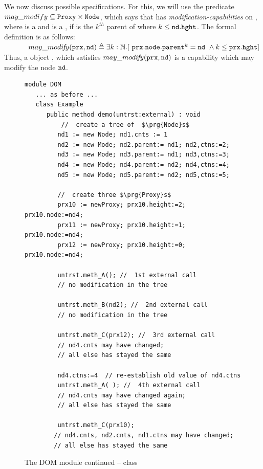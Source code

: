 We now discuss possible specifications. For this, we will use  the predicate $may\_modify \subseteq \mbox{\normalfont{\texttt{Proxy}}} \times \mbox{\normalfont{\texttt{Node}}}$, which says that 
 has \emph{modification-capabilities} on , where  is
a   and  is a , if  is the $k^{th}$  parent
of    where $k \leq \mbox{\normalfont{\texttt{nd}}}.\mbox{\normalfont{\texttt{hght}}}$.
The formal definition is as follows:
\\
$\strut \ \ \ \ \ \ \ \ \ \    may\_modi\!f\!y(\mbox{\normalfont{\texttt{prx}}}, \mbox{\normalfont{\texttt{nd}}}) \triangleq \exists k:\mathbb{N}. [ \  \mbox{\normalfont{\texttt{prx}}}.\mbox{\normalfont{\texttt{node}}}.\mbox{\normalfont{\texttt{parent}}}^k=\mbox{\normalfont{\texttt{nd}}}\ \wedge k\leq   \mbox{\normalfont{\texttt{prx}}}.\mbox{\normalfont{\texttt{hght}}}]$
\\
Thus, a  object , which satisfies $may\_modi\!f\!y(\mbox{\normalfont{\texttt{prx}}},\mbox{\normalfont{\texttt{nd}}})$ is a capability which may modify the node $\mbox{\normalfont{\texttt{nd}}}$. 


\begin{figure}[tbh]
\begin{lstlisting}[language = Chainmail, mathescape=true, frame=lines]
module DOM 
   ... as before ...
   class Example
      public method demo(untrst:external) : void 
          //  create a tree of  $\prg{Node}s$
         nd1 := new Node; nd1.cnts := 1
         nd2 := new Mode; nd2.parent:= nd1; nd2,ctns:=2;
         nd3 := new Mode; nd3.parent:= nd1; nd3,ctns:=3;
         nd4 := new Mode; nd4.parent:= nd2; nd4,ctns:=4;
         nd5 := new Mode; nd5.parent:= nd2; nd5,ctns:=5;
         
         //  create three $\prg{Proxy}s$
         prx10 := newProxy; prx10.height:=2; prx10.node:=nd4;
         prx11 := newProxy; prx10.height:=1; prx10.node:=nd4; 
         prx12 := newProxy; prx10.height:=0; prx10.node:=nd4;
          
         untrst.meth_A(); //  1st external call  
         // no modification in the tree
         
         untrst.meth_B(nd2); //  2nd external call  
         // no modification in the tree     
         
         untrst.meth_C(prx12); //  3rd external call  
         // nd4.cnts may have changed; 
         // all else has stayed the same
         
         nd4.ctns:=4  // re-establish old value of nd4.ctns
         untrst.meth_A( ); //  4th external call  
         // nd4.cnts may have changed again; 
         // all else has stayed the same
         
         untrst.meth_C(prx10);
        // nd4.cnts, nd2.cnts, nd1.ctns may have changed; 
        // all else has stayed the same          
\end{lstlisting}
\caption{The DOM module continued -- class  }
\label{fig:DoMCodeClient}
\end{figure}


